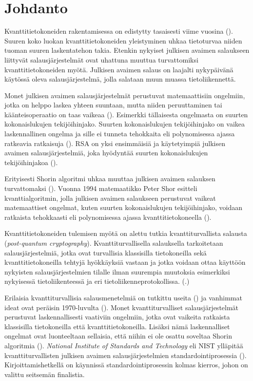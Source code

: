 \chapter{Johdanto\label{intro}}
Kvanttitietokoneiden rakentamisessa on edistytty tasaisesti viime vuosina (\cite{alagic2020status}). Suuren koko luokan kvanttitietokoneiden yleistyminen uhkaa tietoturvaa niiden tuoman suuren laskentatehon takia. Etenkin nykyiset julkisen avaimen salaukseen liittyvät salausjärjestelmät ovat uhattuna muuttua turvattomiksi kvanttitietokoneiden myötä. Julkisen avaimen salaus on laajalti nykypäivänä käytössä oleva salausjärjestelmä, jolla salataan muun muassa tietoliikennettä. %

Monet julkisen avaimen salausjärjestelmät perustuvat matemaattisiin ongelmiin, jotka on helppo laskea yhteen suuntaan, mutta niiden peruuttaminen tai käänteisoperaatio on taas vaikeaa (\cite{mavroeidis2018impact}). Esimerkki tällaisesta ongelmasta on suurten kokonaislukujen tekijöihinjako. Suurten kokonaislukujen tekijöihinjako on vaikea laskennallinen ongelma ja sille ei tunneta tehokkaita eli polynomisessa ajassa ratkeavia ratkaisuja (\cite{doi:10.1137/S0036144598347011}). RSA on yksi ensimmäisiä ja käytetyimpiä julkisen avaimen salausjärjestelmiä, joka hyödyntää suurten kokonaislukujen tekijöihinjakoa (\cite{montgomery1994survey}).

Erityisesti Shorin algoritmi uhkaa muuttaa julkisen avaimen salauksen turvattomaksi (\cite{mavroeidis2018impact}). Vuonna 1994 matemaatikko Peter Shor esitteli kvanttialgoritmin, jolla julkisen avaimen salaukseen perustuvat vaikeat matemaattiset ongelmat, kuten suurten kokonaislukujen tekijöihinjako, voidaan ratkaista tehokkaasti eli polynomisessa ajassa kvanttitietokoneella (\cite{doi:10.1137/S0036144598347011}).

Kvanttitietokoneiden tulemisen myötä on alettu tutkia kvanttiturvallista salausta (\emph{post-quantum cryptography}). Kvanttiturvallisella salauksella tarkoitetaan salausjärjestelmiä, jotka ovat turvallisia klassisilla tietokoneilla sekä kvanttitietokoneilla tehtyjä hyökkäyksiä vastaan ja jotka voidaan ottaa käyttöön nykyisten salausjärjestelmien tilalle ilman suurempia muutoksia esimerkiksi nykyisessä tietoliikenteessä ja eri tietoliikenneprotokollissa. (\cite{alagic2020status}.)

Erilaisia kvanttiturvallisia salausmenetelmiä on tutkittu useita (\cite{mavroeidis2018impact}) ja vanhimmat ideat ovat peräisin 1970-luvulta (\cite{repka2014overview}). Monet kvanttiturvalliset salausjärjestelmät perustuvat laskennallisesti vaativiin ongelmiin, jotka ovat vaikeita ratkaista klassisilla tietokoneilla että kvanttitietokoneilla. Lisäksi nämä laskennalliset ongelmat ovat luonteeltaan sellaisia, että niihin ei ole osattu soveltaa Shorin algoritmia (\cite{bernstein2017post}). \emph{National Institute of Standards and Technology} eli NIST ylläpitää kvanttiturvallisten julkisen avaimen salausjärjestelmien standardointiprosessia (\cite{alagic2020status}). Kirjoittamishetkellä on käynnissä standardointiprosessin kolmas kierros, johon on valittu seitsemän finalistia.


